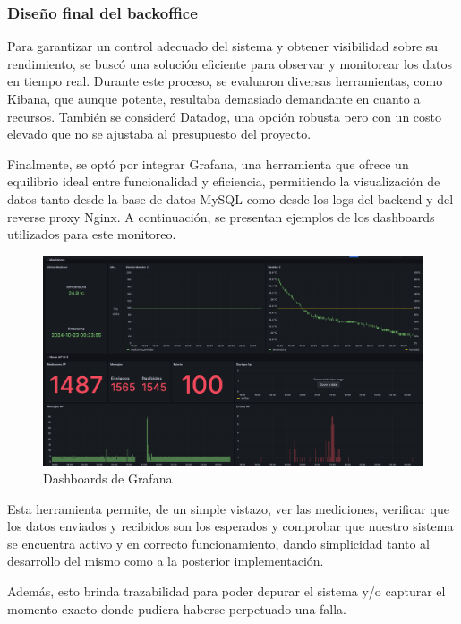{\subsubsection{Diseño final del backoffice}

Para garantizar un control adecuado del sistema y obtener visibilidad sobre su rendimiento, se buscó una solución eficiente para observar y monitorear los datos en tiempo real. Durante este proceso, se evaluaron diversas herramientas, como Kibana, que aunque potente, resultaba demasiado demandante en cuanto a recursos. También se consideró Datadog, una opción robusta pero con un costo elevado que no se ajustaba al presupuesto del proyecto.

Finalmente, se optó por integrar Grafana, una herramienta que ofrece un equilibrio ideal entre funcionalidad y eficiencia, permitiendo la visualización de datos tanto desde la base de datos MySQL como desde los logs del backend y del reverse proxy Nginx. A continuación, se presentan ejemplos de los dashboards utilizados para este monitoreo.

\begin{figure}[H]
	\centering
	\includegraphics[scale=.3]{./Figures/PortalWeb/Grafana-dashboard.jpeg}
	\caption{Dashboards de Grafana}
	\label{fig:grafana-dashboard}
\end{figure}

Esta herramienta permite, de un simple vistazo, ver las mediciones, verificar que los datos enviados y recibidos son los esperados y comprobar que nuestro sistema se encuentra activo y en correcto funcionamiento, dando simplicidad tanto al desarrollo del mismo como a la posterior implementación. 

Además, esto brinda trazabilidad para poder depurar el sistema y/o capturar el momento exacto donde pudiera haberse perpetuado una falla. 





}
